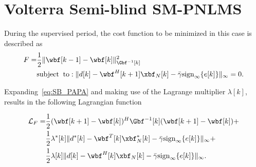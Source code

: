\section{Volterra Semi-blind SM-PNLMS}
\label{app:SB}
During the supervised period, the cost function to be minimized in this case is described as
\begin{align}\label{eq:SB_PAPA}
\begin{split}
	F = &\frac{1}{2}\Vert \wbf[k-1] - \wbf[k] \Vert_{\Gbf^{-1}[k]}^2\\
	&\mathrm{subject\;\;to:\;} \Vert d[k] - \wbf^H[k+1]\xbf_N[k]- \bar{\gamma}\mathrm{sign}_{\infty}\{e[k]\}\Vert_\infty = 0.
\end{split}
\end{align}

Expanding~\eqref{eq:SB_PAPA} and  making use of the Lagrange multiplier $\lambda[k]$, results in the following Lagrangian function

\begin{align}\label{eq:lagrange_SB_SM_PNLMS}
	\begin{split}
		\mathcal{L}_F =& \frac{1}{2}(\wbf[k+1] - \wbf[k])^H\Gbf^{-1}[k](\wbf[k+1] - \wbf[k]) + \\
		&\frac{1}{2}\lambda^*[k] \Vert d^*[k] - \wbf^T[k]\xbf_N^*[k] - \bar{\gamma}\mathrm{sign}_{\infty}\{e[k]\}\Vert_\infty+ \\
		&\frac{1}{2}\lambda[k] \Vert d[k] - \wbf^H[k]\xbf_N[k] - \bar{\gamma}\mathrm{sign}_{\infty}\{e[k]\}\Vert_\infty.
	\end{split}
\end{align}


